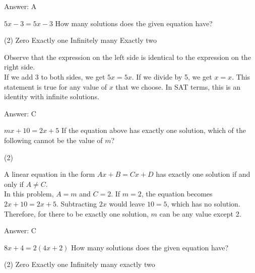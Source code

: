 \documentclass[11pt,paper=a4,answers]{exam}
\begin{document}
\begin{questions}
\begin{solution}
\vspace{20pt}
Answer: \colorbox{yellow!100}{A}
\end{solution}

\question
$5x - 3 = 5x - 3$
How many solutions does the given equation have?
\begin{tasks}(2)
    \task Zero
    \task Exactly one
    \task Infinitely many
    \task Exactly two
\end{tasks}

\begin{solution}
Observe that the expression on the left side is identical to the expression on the right side. 
\\[10pt]
If we add 3 to both sides, we get $5x = 5x$. If we divide by 5, we get $x = x$. This statement is true for any value of $x$ that we choose. In SAT terms, this is an identity with infinite solutions.

\vspace{20pt}
Answer: \colorbox{yellow!100}{C}
\end{solution}

\question
$mx + 10 = 2x + 5$
If the equation above has exactly one solution, which of the following cannot be the value of $m$?
\begin{tasks}(2)
\end{tasks}

\begin{solution}
A linear equation in the form $Ax + B = Cx + D$ has exactly one solution if and only if $A \neq C$. 
\\[10pt]
In this problem, $A = m$ and $C = 2$. If $m = 2$, the equation becomes $2x + 10 = 2x + 5$. Subtracting $2x$ would leave $10 = 5$, which has no solution. 
\\[10pt]
Therefore, for there to be exactly one solution, $m$ can be any value except 2.

\vspace{20pt}
Answer: \colorbox{yellow!100}{C}
\end{solution}

\question
$8x + 4 = 2(4x + 2)$
How many solutions does the given equation have?
\begin{tasks}(2)
    \task Zero
    \task Exactly one
    \task Infinitely many
    \task exactly two
\end{tasks}


\end{questions}
\end{document}
